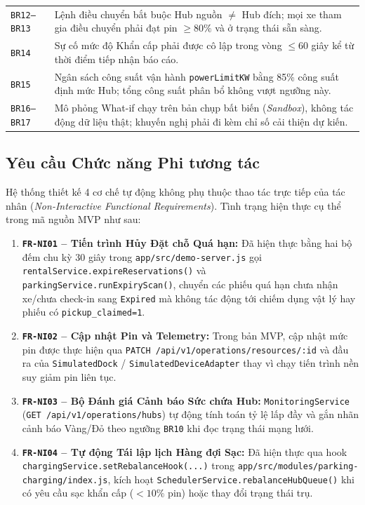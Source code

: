 \begin{longtable}{>{\raggedright\arraybackslash}p{2.3cm} >{\raggedright\arraybackslash}p{12.2cm}}
\texttt{BR12--BR13} & Lệnh điều chuyển bắt buộc Hub nguồn $\ne$ Hub đích; mọi xe tham gia điều chuyển phải đạt pin $\ge 80\%$ và ở trạng thái sẵn sàng. \\
\texttt{BR14} & Sự cố mức độ Khẩn cấp phải được cô lập trong vòng $\le 60$ giây kể từ thời điểm tiếp nhận báo cáo. \\
\texttt{BR15} & Ngân sách công suất vận hành \texttt{powerLimitKW} bằng 85\% công suất định mức Hub; tổng công suất phân bổ không vượt ngưỡng này. \\
\texttt{BR16--BR17} & Mô phỏng What-if chạy trên bản chụp bất biến (\textit{Sandbox}), không tác động dữ liệu thật; khuyến nghị phải đi kèm chỉ số cải thiện dự kiến. \\
\end{longtable}

\subsection{Yêu cầu Chức năng Phi tương tác}

Hệ thống thiết kế 4 cơ chế tự động không phụ thuộc thao tác trực tiếp của tác nhân (\textit{Non-Interactive Functional Requirements}). Tình trạng hiện thực cụ thể trong mã nguồn MVP như sau:
\begin{enumerate}[leftmargin=*,nosep]
    \item \textbf{\texttt{FR-NI01} -- Tiến trình Hủy Đặt chỗ Quá hạn:} Đã hiện thực bằng hai bộ đếm chu kỳ 30 giây trong \texttt{app/src/demo-server.js} gọi \texttt{rentalService.\allowbreak expireReservations()} và \texttt{parkingService.\allowbreak runExpiryScan()}, chuyển các phiếu quá hạn chưa nhận xe/chưa check-in sang \texttt{Expired} mà không tác động tới chiếm dụng vật lý hay phiếu có \texttt{pickup\_claimed=1}.
    \item \textbf{\texttt{FR-NI02} -- Cập nhật Pin và Telemetry:} Trong bản MVP, cập nhật mức pin được thực hiện qua \texttt{PATCH /api/v1/\allowbreak operations/\allowbreak resources/:id} và đầu ra của \texttt{SimulatedDock} / \texttt{Simulated\allowbreak Device\allowbreak Adapter} thay vì chạy tiến trình nền suy giảm pin liên tục.
    \item \textbf{\texttt{FR-NI03} -- Bộ Đánh giá Cảnh báo Sức chứa Hub:} \texttt{Monitoring\allowbreak Service} (\texttt{GET /api/v1/\allowbreak operations/\allowbreak hubs}) tự động tính toán tỷ lệ lấp đầy và gắn nhãn cảnh báo Vàng/Đỏ theo ngưỡng \texttt{BR10} khi đọc trạng thái mạng lưới.
    \item \textbf{\texttt{FR-NI04} -- Tự động Tái lập lịch Hàng đợi Sạc:} Đã hiện thực qua hook \texttt{chargingService.\allowbreak setRebalanceHook(...)} trong \texttt{app/src/\allowbreak modules/\allowbreak parking-charging/\allowbreak index.js}, kích hoạt \texttt{SchedulerService.\allowbreak rebalanceHubQueue()} khi có yêu cầu sạc khẩn cấp ($<10\%$ pin) hoặc thay đổi trạng thái trụ.
\end{enumerate}
